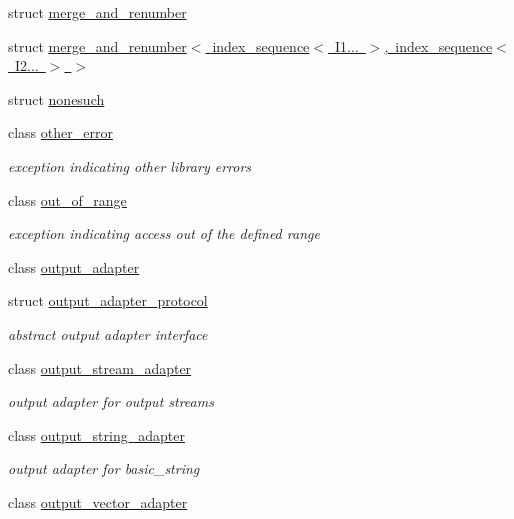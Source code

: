 \begin{DoxyCompactItemize}
struct \mbox{\hyperlink{structnlohmann_1_1detail_1_1merge__and__renumber}{merge\+\_\+and\+\_\+renumber}}
\item 
struct \mbox{\hyperlink{structnlohmann_1_1detail_1_1merge__and__renumber_3_01index__sequence_3_01I1_8_8_8_01_4_00_01inde4885d6f1d93a04f25932afbd429c4793}{merge\+\_\+and\+\_\+renumber$<$ index\+\_\+sequence$<$ I1... $>$, index\+\_\+sequence$<$ I2... $>$ $>$}}
\item 
struct \mbox{\hyperlink{structnlohmann_1_1detail_1_1nonesuch}{nonesuch}}
\item 
class \mbox{\hyperlink{classnlohmann_1_1detail_1_1other__error}{other\+\_\+error}}
\begin{DoxyCompactList}\small\item\em exception indicating other library errors \end{DoxyCompactList}\item 
class \mbox{\hyperlink{classnlohmann_1_1detail_1_1out__of__range}{out\+\_\+of\+\_\+range}}
\begin{DoxyCompactList}\small\item\em exception indicating access out of the defined range \end{DoxyCompactList}\item 
class \mbox{\hyperlink{classnlohmann_1_1detail_1_1output__adapter}{output\+\_\+adapter}}
\item 
struct \mbox{\hyperlink{structnlohmann_1_1detail_1_1output__adapter__protocol}{output\+\_\+adapter\+\_\+protocol}}
\begin{DoxyCompactList}\small\item\em abstract output adapter interface \end{DoxyCompactList}\item 
class \mbox{\hyperlink{classnlohmann_1_1detail_1_1output__stream__adapter}{output\+\_\+stream\+\_\+adapter}}
\begin{DoxyCompactList}\small\item\em output adapter for output streams \end{DoxyCompactList}\item 
class \mbox{\hyperlink{classnlohmann_1_1detail_1_1output__string__adapter}{output\+\_\+string\+\_\+adapter}}
\begin{DoxyCompactList}\small\item\em output adapter for basic\+\_\+string \end{DoxyCompactList}\item 
class \mbox{\hyperlink{classnlohmann_1_1detail_1_1output__vector__adapter}{output\+\_\+vector\+\_\+adapter}}

\end{DoxyCompactItemize}
